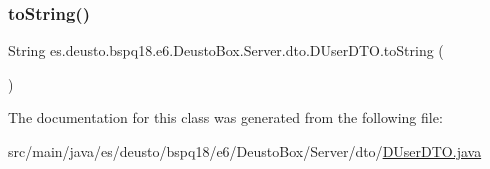\subsubsection{\texorpdfstring{to\+String()}{toString()}}
{\footnotesize\ttfamily String es.\+deusto.\+bspq18.\+e6.\+Deusto\+Box.\+Server.\+dto.\+D\+User\+D\+T\+O.\+to\+String (\begin{DoxyParamCaption}{ }\end{DoxyParamCaption})}



The documentation for this class was generated from the following file\+:\begin{DoxyCompactItemize}
\item 
src/main/java/es/deusto/bspq18/e6/\+Deusto\+Box/\+Server/dto/\mbox{\hyperlink{_d_user_d_t_o_8java}{D\+User\+D\+T\+O.\+java}}\end{DoxyCompactItemize}
